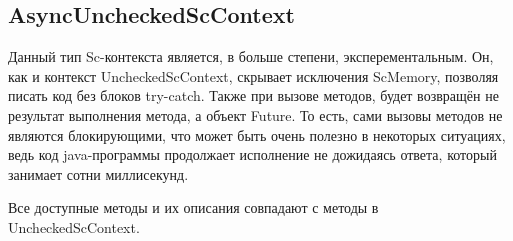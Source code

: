 \subsection{AsyncUncheckedScContext}
Данный тип Sc-контекста является, в больше степени, эксперементальным. Он, как и контекст UncheckedScContext, скрывает исключения ScMemory, позволяя писать код без блоков try-catch. Также при вызове методов, будет возвращён не результат выполнения метода, а объект Future. То есть, сами вызовы методов не являются блокирующими, что может быть очень полезно в некоторых ситуациях, ведь код java-программы продолжает исполнение не дожидаясь ответа, который занимает сотни миллисекунд. 

Все доступные методы и их описания совпадают с методы в UncheckedScContext. 